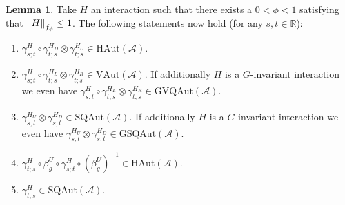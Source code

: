 \documentclass[12pt,a4paper,twoside]{article}
\renewcommand{\AA}{\mathcal A}
\newcommand{\RR}{\mathbb R}
\theoremstyle{definition}
\newtheorem{lemma}[theorem]{Lemma}
\numberwithin{equation}{section}
\begin{document}
\begin{lemma}\label{lem:PropertiesLocallyGeneratedAutomorphisms}
	Take $H$ an interaction such that there exists a $0<\phi<1$ satisfying that $\norm{H}_{f_\phi}\leq 1$. The following statements now hold (for any $s,t\in\RR$):
	\begin{enumerate}
		\item $\gamma^H_{s;t}\circ\gamma^{H_D}_{t;s}\otimes\gamma^{H_U}_{t;s}\in\textrm{HAut}(\AA)$.
		\item $\gamma^H_{s;t}\circ\gamma^{H_L}_{t;s}\otimes\gamma^{H_R}_{t;s}\in\textrm{VAut}(\AA)$. If additionally $H$ is a $G$-invariant interaction we even have $\gamma^H_{s;t}\circ\gamma^{H_L}_{t;s}\otimes\gamma^{H_R}_{t;s}\in\textrm{GVQAut}(\AA)$.
		\item $\gamma^{H_U}_{s;t}\otimes\gamma^{H_D}_{s;t}\in\textrm{SQAut}(\AA)$. If additionally $H$ is a $G$-invariant interaction we even have $\gamma^{H_U}_{s;t}\otimes\gamma^{H_D}_{s;t}\in\textrm{GSQAut}(\AA)$.
		\item $\gamma^{H}_{t;s}\circ\beta_g^U\circ\gamma^{H}_{s;t}\circ(\beta_g^U)^{-1}\in\textrm{HAut}(\AA)$.
		\item $\gamma^{H}_{t;s}\in\textrm{SQAut}(\AA)$.
	\end{enumerate}
\end{lemma}
\end{document}
